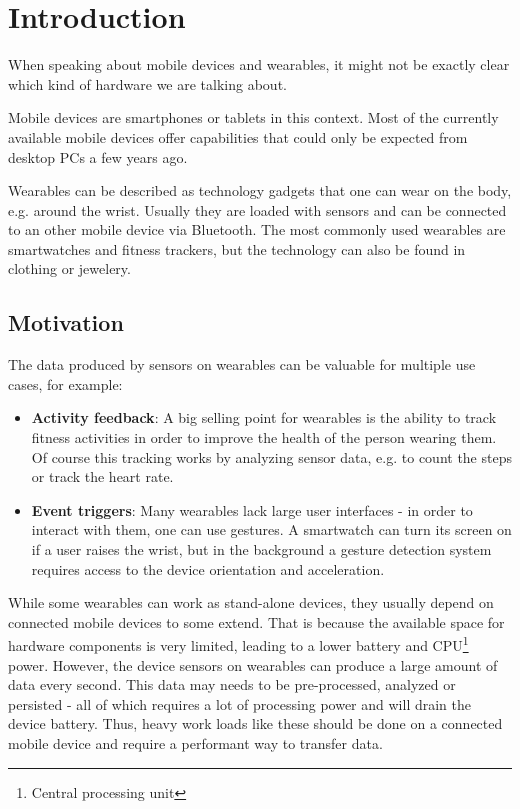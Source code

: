 \section{Introduction}
\label{sec:intro}

When speaking about mobile devices and wearables, it might not be exactly clear which kind of hardware we are talking about.

Mobile devices are smartphones or tablets in this context. Most of the currently available mobile devices offer capabilities that could only be expected from desktop PCs a few years ago.

Wearables can be described as technology gadgets that one can wear on the body, e.g. around the wrist.
Usually they are loaded with sensors and can be connected to an other mobile device via Bluetooth.
The most commonly used wearables are smartwatches and fitness trackers, but the technology can also be found in clothing or jewelery.

\subsection{Motivation}
\label{sec:intro:motivation}

The data produced by sensors on wearables can be valuable for multiple use cases, for example:
\begin{itemize}[noitemsep]
	\item \textbf{Activity feedback}:
	A big selling point for wearables is the ability to track fitness activities in order to improve the health of the person wearing them.
	Of course this tracking works by analyzing sensor data, e.g. to count the steps or track the heart rate.
	\item \textbf{Event triggers}:
	Many wearables lack large user interfaces - in order to interact with them, one can use gestures.
	A smartwatch can turn its screen on if a user raises the wrist, but in the background a gesture detection system requires access to the device orientation and acceleration.
\end{itemize}

While some wearables can work as stand-alone devices, they usually depend on connected mobile devices to some extend.
That is because the available space for hardware components is very limited, leading to a lower battery and CPU\footnote{Central processing unit} power.
However, the device sensors on wearables can produce a large amount of data every second.
This data may needs to be pre-processed, analyzed or persisted - all of which requires a lot of processing power and will drain the device battery.
Thus, heavy work loads like these should be done on a connected mobile device and require a performant way to transfer data.

